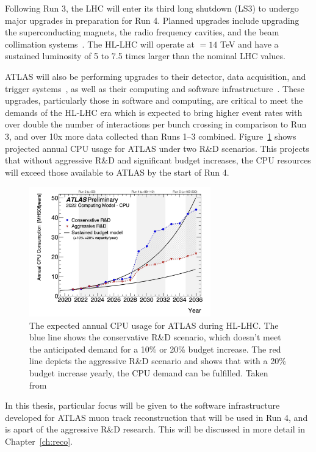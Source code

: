 
Following Run 3, the LHC will enter its third long shutdown (LS3) to undergo major upgrades in preparation for Run 4. Planned upgrades include upgrading the superconducting magnets, the radio frequency cavities, and the beam collimation systems~\cite{lhc_upgrade_run4}. The HL-LHC will operate at \com{} $= 14$ TeV and have a sustained luminosity of 5 to 7.5 times larger than the nominal LHC values.

ATLAS will also be performing upgrades to their detector, data acquisition, and trigger systems~\cite{atlas_detector_upgrade_run4}, as well as their computing and software infrastructure~\cite{CERN-LHCC-2022-005}. These upgrades, particularly those in software and computing, are critical to meet the demands of the HL-LHC era which is expected to bring higher event rates with over double the number of interactions per bunch crossing in comparison to Run 3, and over 10x more data collected than Runs 1--3 combined.
Figure~\ref{fig:atlas_cpu_usage} shows projected annual CPU usage for ATLAS under two R\&D scenarios. This projects that without aggressive R\&D and significant budget increases, the CPU resources will exceed those available to ATLAS by the start of Run 4. 

\begin{figure}[pht]
    \centering
    \includegraphics[width=0.7\textwidth]{figures/atlas/atlas_cpu_usage.png}
    \caption{The expected annual CPU usage for ATLAS during HL-LHC\@. The blue line shows the conservative R\&D scenario, which doesn't meet the anticipated demand for a 10\% or 20\% budget increase. The red line depicts the aggressive R\&D scenario and shows that with a 20\% budget increase yearly, the CPU demand can be fulfilled. Taken from~\cite{CERN-LHCC-2022-005}
    }\label{fig:atlas_cpu_usage}
\end{figure}

In this thesis, particular focus will be given to the software infrastructure developed for ATLAS muon track reconstruction that will be used in Run 4, and is apart of the aggressive R\&D research. This will be discussed in more detail in Chapter~\ref{ch:reco}.
